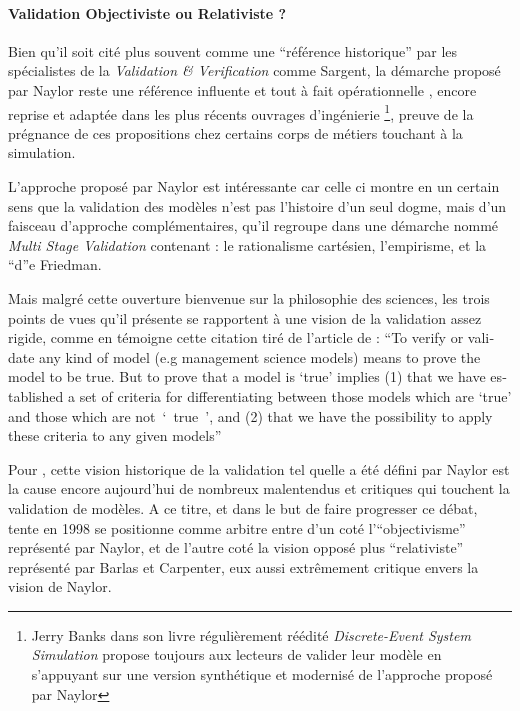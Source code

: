 \paragraph{Validation Objectiviste ou Relativiste ?}

Bien qu'il soit cité plus souvent comme une \enquote{référence historique} par les spécialistes de la \textit{Validation \& Verification} comme Sargent, la démarche proposé par Naylor reste une référence influente et tout à fait opérationnelle \autocite{Nance2002}, encore reprise et adaptée dans les plus récents ouvrages d’ingénierie \footnote{Jerry Banks dans son livre régulièrement réédité \textit{Discrete-Event System Simulation} propose toujours aux lecteurs de valider leur modèle en s'appuyant sur une version synthétique et modernisé de l'approche proposé par Naylor}, preuve de la prégnance de ces propositions chez certains corps de métiers touchant à la simulation.

L'approche proposé par Naylor est intéressante car celle ci montre en un certain sens que la validation des modèles n'est pas l'histoire d'un seul dogme, mais d'un faisceau d'approche complémentaires, qu'il regroupe dans une démarche nommé \textit{Multi Stage Validation} contenant : le rationalisme cartésien, l'empirisme, et la \foreignquote{positive economics} de Friedman.

Mais malgré cette ouverture bienvenue sur la philosophie des sciences, les trois points de vues qu'il présente se rapportent à une vision de la validation assez rigide, comme en témoigne cette citation tiré de l'article de \textcite{Naylor1967} : \foreignquote{english}{To verify or validate any kind of model (e.g management science models) means to prove the model to be true. But to prove that a model is \enquote{true} implies (1) that we have established a set of criteria for differentiating between those models which are \enquote{true} and those which are not \enquote{ true }, and (2) that we have the possibility to apply these criteria to any given models}

Pour \textcite{Kleindorfer1998}, cette vision historique de la validation tel quelle a été défini par Naylor est la cause encore aujourd'hui de nombreux malentendus et critiques qui touchent la validation de modèles. A ce titre, et dans le but de faire progresser ce débat, \textcite{Kleindorfer1998} tente en 1998 se positionne comme arbitre entre d'un coté l'\enquote{objectivisme} représenté par Naylor, et de l'autre coté la vision opposé plus \enquote{relativiste} représenté par Barlas et Carpenter, eux aussi extrêmement critique envers la vision de Naylor.

